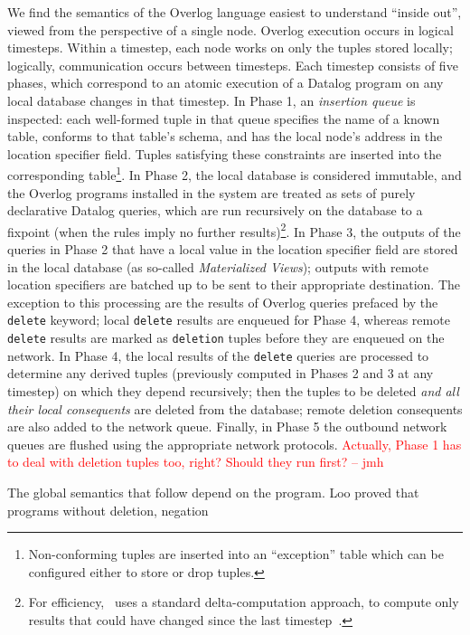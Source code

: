 \documentclass{sig-alternate}
\newcommand{\jmh}[1]{{\textcolor{red}{#1 -- jmh}}}
\begin{document}
We find the semantics of the Overlog language easiest to understand ``inside out'', viewed from the perspective of a single node.  Overlog execution occurs in logical timesteps. Within a timestep, each node works on only the tuples stored locally; logically, communication occurs between timesteps. Each timestep consists of five phases, which correspond to an atomic execution of a Datalog program on any local database changes in that timestep.  In Phase 1, an {\em insertion queue} is inspected: each well-formed tuple in that queue specifies the name of a known table,  conforms to that table's schema, and has the local node's address in the location specifier field.  Tuples satisfying these constraints are inserted into the corresponding table\footnote{Non-conforming tuples are inserted into an ``exception'' table which can be configured either to store or drop tuples.}.  In Phase 2, the local database is considered immutable, and the Overlog programs installed in the system are treated as sets of purely declarative Datalog queries, which are run recursively on the database to a fixpoint (when the rules imply no further results)\footnote{For efficiency, \JOL\ uses a standard delta-computation approach, to compute only results that could have changed since the last timestep~\cite{ross-matviews}.}.  In Phase 3, the outputs of the queries in Phase 2 that have a local value in the location specifier field are stored in the local database (as so-called {\em Materialized Views}); outputs with remote location specifiers are batched up to be sent to their appropriate destination.  The exception to this processing are the results of Overlog queries prefaced by the {\tt delete} keyword; local {\tt delete} results are enqueued for Phase 4, whereas remote {\tt delete} results are marked as {\tt deletion} tuples before they are enqueued on the network.  In Phase 4, the local results of the {\tt delete} queries are processed to determine any derived tuples (previously computed in Phases 2 and 3 at any timestep) on which they depend recursively; then the tuples to be deleted {\em and all their local consequents} are deleted from the database; remote deletion consequents are also added to the network queue.  Finally, in Phase 5 the outbound network queues are flushed using the appropriate network protocols.   \jmh{Actually, Phase 1 has to deal with deletion tuples too, right?  Should they run first?}



The global semantics that follow depend on the program. Loo proved that programs without deletion, negation 
\end{document}
